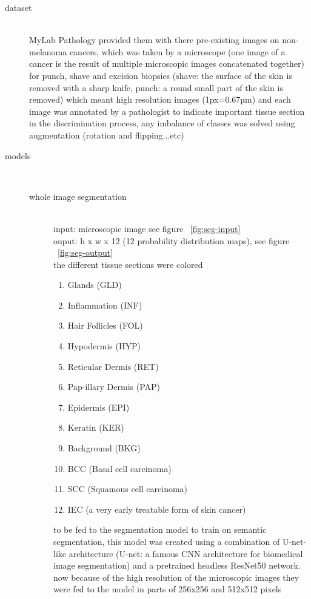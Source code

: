 \begin{description}
\item[dataset] \hfill \\
    MyLab Pathology provided them with there pre-existing images on non-melanoma cancers, which was taken by a microscope (one image of a cancer is the result of multiple microscopic images concatenated together) for punch, shave and excision biopsies (shave: the surface of the skin is removed with a sharp knife, punch: a round small part of the skin is removed) which meant high resolution images (1px=0.67µm) and each image was annotated by a pathologist to indicate important tissue section in the discrimination process, any imbalance of classes was solved using augmentation (rotation and flipping...etc)

\item[models] \hfill \\
    \begin{description}
    \item[whole image segmentation] \hfill \\
        input: microscopic image  see figure ~\ref{fig:seg-input} \hfill \\
        ouput: h x w x 12 (12 probability distribution maps), see figure ~\ref{fig:seg-output}  \hfill \\
        the different tissue sections were colored 
        \begin{enumerate}
            \item Glands (GLD) 
            \item Inflammation (INF) 
            \item Hair Follicles (FOL) 
            \item Hypodermis (HYP) 
            \item Reticular Dermis (RET) 
            \item Pap-illary Dermis (PAP) 
            \item Epidermis (EPI) 
            \item Keratin (KER) 
            \item Background (BKG) 
            \item BCC (Basal cell carcinoma)
            \item SCC (Squamous cell carcinoma)
            \item IEC (a very early treatable form of skin cancer)
        \end{enumerate}
        to be fed to the segmentation model to train on semantic segmentation, this model was created using a combination of U-net-like architecture (U-net: a famous CNN architecture for biomedical image segmentation) and a pretrained headless ResNet50 network. now because of the high resolution of the microscopic images they were fed to the model in parts of 256x256 and 512x512 pixels


\end{description}
\end{description}
